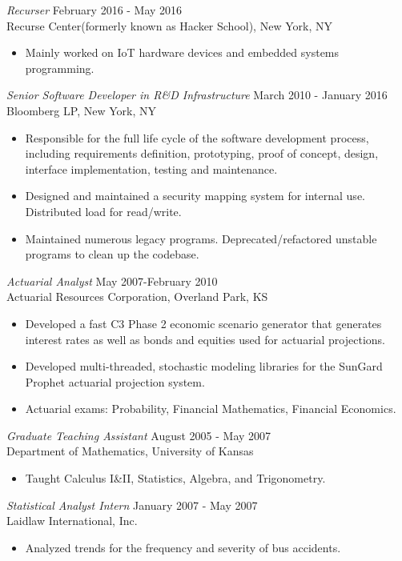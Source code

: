 \documentclass[margin]{res}
\begin{document}
\begin{resume}
		{\sl Recurser} \hfill February  2016 - May 2016\\
		Recurse Center(formerly known as Hacker School),
                New York, NY
 \begin{itemize}  
	       \item Mainly worked on IoT hardware devices and embedded systems programming.
\end {itemize}
		{\sl Senior Software Developer in R\&D Infrastructure} \hfill March 2010 - January 2016\\
                Bloomberg LP,
                New York, NY 
                 \begin{itemize}  
		 \item Responsible for the full life cycle of the software development process, including requirements definition, prototyping, proof of concept, design, interface implementation, testing and maintenance.
                 \item Designed and maintained a security mapping system for internal use. Distributed load for read/write.
		 \item Maintained numerous legacy programs. Deprecated/refactored unstable programs to clean up the codebase.
		 \end {itemize}
		{\sl Actuarial Analyst} \hfill May 2007-February 2010\\
                Actuarial Resources Corporation,
                Overland Park, KS
                 \begin{itemize} 
                 \item Developed a fast C3 Phase 2 economic scenario generator that generates
                   interest rates as well as bonds and equities used for actuarial projections.
                 \item Developed multi-threaded, stochastic modeling libraries for the SunGard Prophet actuarial projection system.
                 \item Actuarial exams: Probability, Financial Mathematics, Financial Economics.
                 \end{itemize}
                {\sl Graduate Teaching Assistant} \hfill            August 2005 - May 2007\\
                Department of Mathematics, University of Kansas 
                 \begin{itemize}
                 \item Taught Calculus I\&II, Statistics, Algebra, and Trigonometry.
                 \end{itemize} 
                {\sl Statistical Analyst Intern} \hfill             January 2007 - May 2007\\
                Laidlaw International, Inc.
                 \begin{itemize}  \itemsep -2pt %
                 \item Analyzed trends for the frequency and severity of bus accidents.
                 \end{itemize} 

\end{resume}
\end{document}
